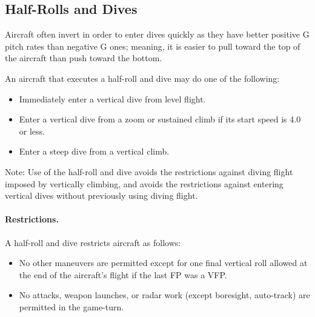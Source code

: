 \subsection{Half-Rolls and Dives}
\label{rule:half-rolls-and-dives}

Aircraft often invert in order to enter dives quickly as they have better positive G pitch rates than negative G ones; meaning, it is easier to pull toward the top of the aircraft than push toward the bottom. 

An aircraft that executes a half-roll and dive may do one of the following:

\begin{itemize}

    \item Immediately enter a vertical dive from level flight.

    \item Enter a vertical dive from a zoom or sustained climb if its start speed is 4.0 or less.

    \item Enter a steep dive from a vertical climb.

\end{itemize}

Note: Use of the half-roll and dive avoids the restrictions against diving flight imposed by vertically climbing, and avoids the restrictions against entering vertical dives without previously using diving flight.    

\paragraph{Restrictions.} A half-roll and dive restricts aircraft as follows:

\begin{itemize}



    \item No other maneuvers are permitted except for one final vertical roll allowed at the end of the aircraft's flight if the last FP was a VFP.

    \item No attacks, weapon launches, or radar work (except boresight, auto-track) are permitted in the game-turn.
    
\end{itemize}

